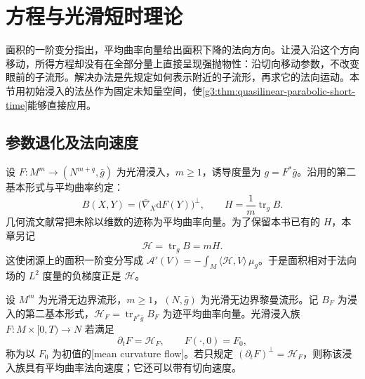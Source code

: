 
% 
% 

\section{方程与光滑短时理论}
\label{g3:sec:2801}

面积的一阶变分指出，平均曲率向量给出面积下降的法向方向。让浸入沿这个方向移动，所得方程却没有在全部分量上直接呈现强抛物性：沿切向移动参数，不改变眼前的子流形。解决办法是先规定如何表示附近的子流形，再求它的法向运动。本节用初始浸入的法丛作为固定未知量空间，使\cref{g3:thm:quasilinear-parabolic-short-time}能够直接应用。

\subsection{参数退化及法向速度}
\label{g3:subsec:2801:01}
设 \(F:M^m\to(N^{m+q},\bar g)\) 为光滑浸入，\(m\ge1\)，诱导度量为 \(g=F^*\bar g\)。沿用的第二基本形式与平均曲率约定：
\[
B(X,Y)=\bigl(\bar\nabla_X\mathrm dF(Y)\bigr)^\perp,
\qquad H=\frac1m\operatorname{tr}_g B.
\]
几何流文献常把未除以维数的迹称为平均曲率向量。为了保留本书已有的 \(H\)，本章另记
\begin{equation}\label{g3:eq:mcf-trace-convention}
	\mathcal H=\operatorname{tr}_gB=mH.
\end{equation}
这使闭源上的面积一阶变分写成
\(\mathcal A'(V)=-\int_M\langle\mathcal H,V\rangle\,\mu_g\)。于是面积相对于法向场的 \(L^2\) 度量的负梯度正是 \(\mathcal H\)。

\begin{definition}\label{g3:def:mean-curvature-flow}
	设 \(M^m\) 为光滑无边界流形，\(m\ge1\)，\((N,\bar g)\) 为光滑无边界黎曼流形。记 \(B_F\) 为浸入的第二基本形式，\(\mathcal H_F=\operatorname{tr}_{F^*\bar g}B_F\) 为迹平均曲率向量。光滑浸入族 \(F:M\times[0,T)\to N\) 若满足
	\begin{equation}\label{g3:eq:mean-curvature-flow}
		\partial_tF=\mathcal H_F,\qquad F(\cdot,0)=F_0,
	\end{equation}
	称为以 \(F_0\) 为初值的[mean curvature flow]。若只规定 \((\partial_tF)^\perp=\mathcal H_F\)，则称该浸入族具有平均曲率法向速度；它还可以带有切向速度。
\end{definition}


